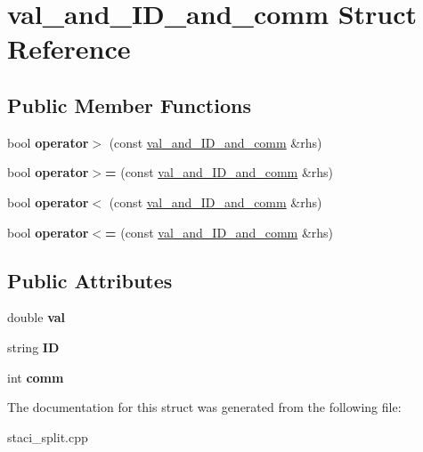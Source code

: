 \hypertarget{structval__and___i_d__and__comm}{}\section{val\+\_\+and\+\_\+\+I\+D\+\_\+and\+\_\+comm Struct Reference}
\label{structval__and___i_d__and__comm}
\subsection*{Public Member Functions}
\begin{DoxyCompactItemize}
\item 
\mbox{\label{structval__and___i_d__and__comm_aa1fe58561342674b2c4b396d6000ee95}} 
bool {\bfseries operator$>$} (const \hyperlink{structval__and___i_d__and__comm}{val\+\_\+and\+\_\+\+I\+D\+\_\+and\+\_\+comm} \&rhs)
\item 
\mbox{\label{structval__and___i_d__and__comm_ae620ece02f115c562faf5b39a8ce3ad4}} 
bool {\bfseries operator$>$=} (const \hyperlink{structval__and___i_d__and__comm}{val\+\_\+and\+\_\+\+I\+D\+\_\+and\+\_\+comm} \&rhs)
\item 
\mbox{\label{structval__and___i_d__and__comm_ae42991c16b19fd6cae726294426c4661}} 
bool {\bfseries operator$<$} (const \hyperlink{structval__and___i_d__and__comm}{val\+\_\+and\+\_\+\+I\+D\+\_\+and\+\_\+comm} \&rhs)
\item 
\mbox{\label{structval__and___i_d__and__comm_a6754ebad6a6b54e0389a50199df1d86f}} 
bool {\bfseries operator$<$=} (const \hyperlink{structval__and___i_d__and__comm}{val\+\_\+and\+\_\+\+I\+D\+\_\+and\+\_\+comm} \&rhs)
\end{DoxyCompactItemize}
\subsection*{Public Attributes}
\begin{DoxyCompactItemize}
\item 
\mbox{\label{structval__and___i_d__and__comm_a80af12e4991cf5a9bac0e52dea642bf2}} 
double {\bfseries val}
\item 
\mbox{\label{structval__and___i_d__and__comm_aaee16efe80228833c4619b3d8052635f}} 
string {\bfseries ID}
\item 
\mbox{\label{structval__and___i_d__and__comm_a7466ca6b8f92ec56d2cae1b83864de29}} 
int {\bfseries comm}
\end{DoxyCompactItemize}


The documentation for this struct was generated from the following file\+:\begin{DoxyCompactItemize}
\item 
staci\+\_\+split.\+cpp\end{DoxyCompactItemize}
